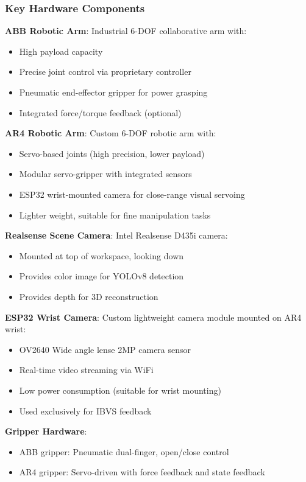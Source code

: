 \subsubsection{Key Hardware Components}

\textbf{ABB Robotic Arm}: Industrial 6-DOF collaborative arm with:
\begin{itemize}
    \item High payload capacity
    \item Precise joint control via proprietary controller
    \item Pneumatic end-effector gripper for power grasping
    \item Integrated force/torque feedback (optional)
\end{itemize}

\textbf{AR4 Robotic Arm}: Custom 6-DOF robotic arm with:
\begin{itemize}
    \item Servo-based joints (high precision, lower payload)
    \item Modular servo-gripper with integrated sensors
    \item ESP32 wrist-mounted camera for close-range visual servoing
    \item Lighter weight, suitable for fine manipulation tasks
\end{itemize}

\textbf{Realsense Scene Camera}: Intel Realsense D435i camera:
\begin{itemize}
    \item Mounted at top of workspace, looking down
    \item Provides color image for YOLOv8 detection
    \item Provides depth for 3D reconstruction 
\end{itemize}

\textbf{ESP32 Wrist Camera}: Custom lightweight camera module mounted on AR4 wrist:
\begin{itemize}
    \item OV2640 Wide angle lense 2MP camera sensor
    \item Real-time video streaming via WiFi
    \item Low power consumption (suitable for wrist mounting)
    \item Used exclusively for IBVS feedback 
\end{itemize}

\textbf{Gripper Hardware}:
\begin{itemize}
    \item ABB gripper: Pneumatic dual-finger, open/close control
    \item AR4 gripper: Servo-driven with force feedback and state feedback
\end{itemize}

